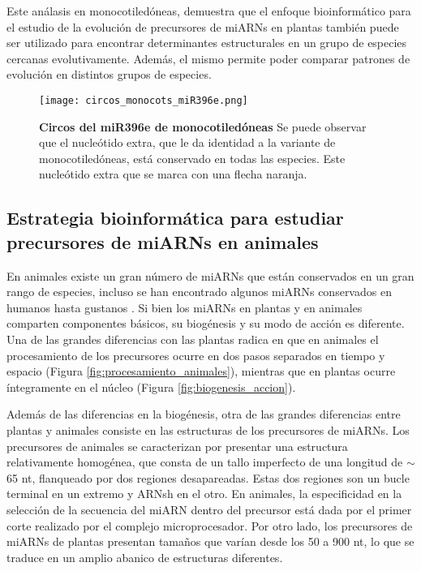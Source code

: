 Este análasis en monocotiledóneas, demuestra que el enfoque bioinformático para el estudio de la evolución de precursores de miARNs en plantas también puede ser utilizado para encontrar determinantes estructurales en un grupo de especies cercanas evolutivamente.  
Además, el mismo permite poder comparar patrones de evolución en distintos grupos de especies.

\begin{figure}[htbp!] 
    \centering    
    \texttt{[image: circos\_monocots\_miR396e.png]}
    \caption[Circos del miR172a]{
    \textbf{Circos del miR396e de monocotiledóneas}
    Se puede observar que el nucleótido extra, que le da identidad a la variante de monocotiledóneas, está conservado en todas las especies.
    Este nucleótido extra que se marca con una flecha naranja.
    }
     \label{fig:circos_monocots_miR396e}
\end{figure}

\subsection{Estrategia bioinformática para estudiar precursores de miARNs en animales}

En animales existe un gran número de miARNs que están conservados en un gran rango de especies, incluso se han encontrado algunos miARNs conservados en humanos hasta gustanos \citep{pmid11081512}.
Si bien los miARNs en plantas y en animales comparten componentes básicos, su biogénesis y su modo de acción es diferente.
Una de las grandes diferencias con las plantas radica en que en animales el procesamiento de los precursores ocurre en dos pasos separados
en tiempo y espacio (Figura \ref{fig:procesamiento_animales}), mientras que en plantas ocurre íntegramente en el núcleo (Figura \ref{fig:biogenesis_accion}).

Además de las diferencias en la biogénesis, otra de las grandes diferencias entre plantas y animales consiste en las estructuras de los precursores de miARNs.
Los precursores de animales se caracterizan por presentar una estructura relativamente homogénea, que consta de un tallo imperfecto de una longitud de $\sim$65 nt, flanqueado por dos regiones desapareadas.
Estas dos regiones son un bucle terminal en un extremo y ARNsh en el otro.
En animales, la especificidad en la selección de la secuencia del miARN dentro del precursor está dada por el primer corte realizado por el complejo microprocesador.
Por otro lado, los precursores de miARNs de plantas presentan tamaños que varían desde los 50 a 900 nt, lo que se traduce en un amplio abanico de estructuras diferentes.


